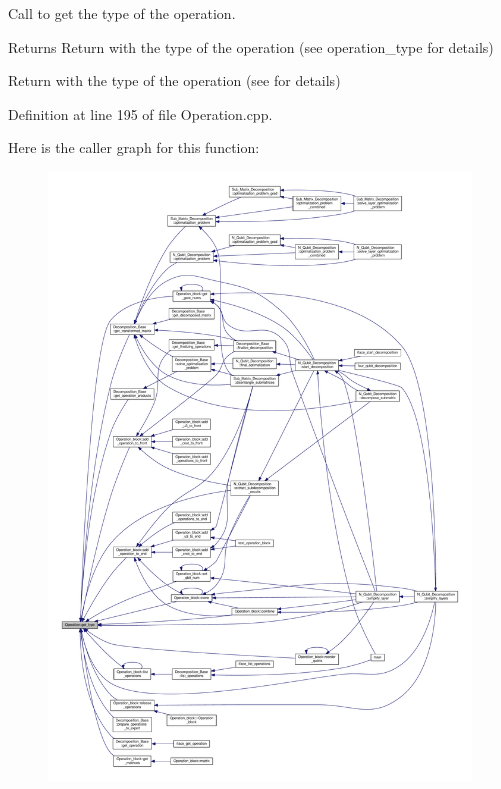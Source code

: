 Call to get the type of the operation. 

\begin{DoxyReturn}{Returns}
Return with the type of the operation (see operation\+\_\+type for details)

Return with the type of the operation (see  for details) 
\end{DoxyReturn}


Definition at line 195 of file Operation.\+cpp.



Here is the caller graph for this function\+:
\nopagebreak
\begin{figure}[H]
\begin{center}
\leavevmode
\includegraphics[width=350pt]{class_operation_acc601a7a00616fd6e2a61f61e084afac_icgraph}
\end{center}
\end{figure}


